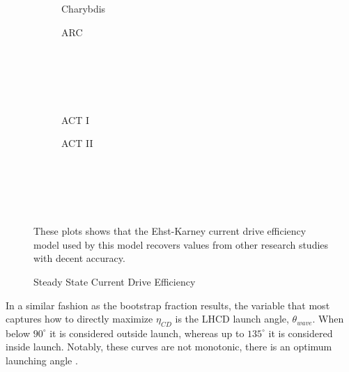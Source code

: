 \begin{figure*}
    \centering
    \hfill
    \begin{subfigure}[t]{0.45\textwidth}
        \centering
		\begin{adjustbox}{width=\textwidth}
			\Large
			
		\end{adjustbox}
        \caption{Charybdis}
    \end{subfigure}
    \hfill
    \begin{subfigure}[t]{0.45\textwidth}
        \centering
		\begin{adjustbox}{width=\textwidth}
			\Large
			
		\end{adjustbox}
        \caption{ARC}
    \end{subfigure}
    \hfill \hfill ~\\ ~\\ ~\\ ~\\
    \hfill
    \begin{subfigure}[t]{0.45\textwidth}
        \centering
		\begin{adjustbox}{width=\textwidth}
			\Large
			
		\end{adjustbox}
        \caption{ACT I}
    \end{subfigure}
    \hfill
    \begin{subfigure}[t]{0.45\textwidth}
        \centering
		\begin{adjustbox}{width=\textwidth}
			\Large
			
		\end{adjustbox}
        \caption{ACT II}
    \end{subfigure}
    \hfill \hfill ~\\ ~\\ ~\\
    \caption{Steady State Current Drive Efficiency}
    \label{fig:steady_eta_CD} ~ \\
    These plots shows that the Ehst-Karney current drive efficiency model\cite{ehstkarney} used by this model recovers values from other research studies with decent accuracy.
\end{figure*}

In a similar fashion as the bootstrap fraction results, the variable that most captures how to directly maximize $\eta_{CD}$ is the LHCD  launch angle, $\theta_{wave}$. When below $90 ^{\circ}$ it is considered outside launch, whereas up to $135 ^{\circ}$ it is considered inside launch. Notably, these curves are not monotonic, there is an optimum launching angle .


